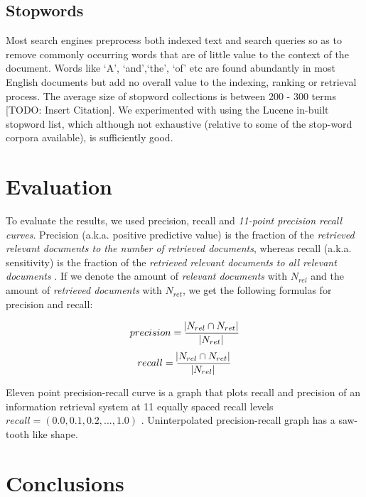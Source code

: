 \subsection{Stopwords}

Most search engines preprocess both indexed text and search queries so as to remove commonly occurring words that are of little value to the context of the document. Words like \lq A', \lq and',\lq the', \lq of' etc are found abundantly in most English documents but add no overall value to the indexing, ranking or retrieval process. The average size of stopword collections is between 200 - 300 terms [TODO: Insert Citation]. We experimented with using the Lucene in-built stopword list, which although not exhaustive (relative to some of the stop-word corpora available), is sufficiently good. 

\section{Evaluation}

To evaluate the results, we used precision, recall and \textit{11-point precision recall curves}. Precision (a.k.a. positive predictive value) is the fraction of the \textit{retrieved relevant documents to the number of retrieved documents}, whereas recall (a.k.a. sensitivity) is the fraction of the \textit{retrieved relevant documents to all relevant documents} \citep{buckland1994relationship}. If we denote the amount of \textit{relevant documents} with $N_{rel}$ and the amount of \textit{retrieved documents} with $ N_{ret} $, we get the following formulas for precision and recall:

\begin{equation}
precision = \frac{ \abs{ N_{rel} \cap N_{ret} } }{\abs{N_{ret}}}
\end{equation}
\begin{equation}
recall = \frac{ \abs{N_{rel} \cap N_{ret} } }{\abs{N_{rel}}}
\end{equation}

Eleven point precision-recall curve is a graph that plots recall and precision of an information retrieval system at 11 equally spaced recall levels $recall = (0.0, 0.1, 0.2,..., 1.0)$ \citep{zhang2009eleven}. Uninterpolated precision-recall graph has a saw-tooth like shape.

\section{Conclusions}

